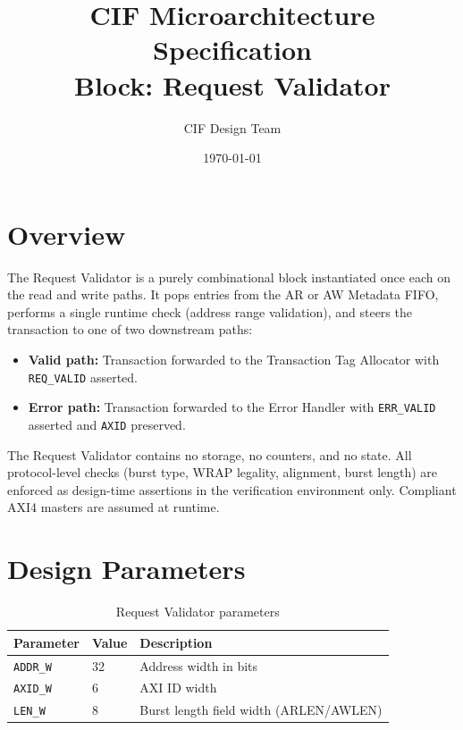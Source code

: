 \documentclass[11pt,a4paper]{article}
\title{\textbf{CIF Microarchitecture Specification}\\[0.4em]
\large Block: Request Validator}
\author{CIF Design Team}
\date{\today}
\begin{document}
\maketitle
\thispagestyle{fancy}
\tableofcontents
\newpage

\section{Overview}

The Request Validator is a purely combinational block instantiated once
each on the read and write paths. It pops entries from the AR or AW
Metadata FIFO, performs a single runtime check (address range
validation), and steers the transaction to one of two downstream paths:

\begin{itemize}
  \item \textbf{Valid path:} Transaction forwarded to the Transaction
        Tag Allocator with \texttt{REQ\_VALID} asserted.
  \item \textbf{Error path:} Transaction forwarded to the Error Handler
        with \texttt{ERR\_VALID} asserted and \texttt{AXID} preserved.
\end{itemize}

The Request Validator contains no storage, no counters, and no state.
All protocol-level checks (burst type, WRAP legality, alignment, burst
length) are enforced as design-time assertions in the verification
environment only. Compliant AXI4 masters are assumed at runtime.

\section{Design Parameters}

\begin{table}[h!]
\centering
\begin{tabular}{lll}
\toprule
\textbf{Parameter} & \textbf{Value} & \textbf{Description} \\
\midrule
\texttt{ADDR\_W}  & 32 & Address width in bits \\
\texttt{AXID\_W}  & 6  & AXI ID width \\
\texttt{LEN\_W}   & 8  & Burst length field width (ARLEN/AWLEN) \\
\bottomrule
\end{tabular}
\caption{Request Validator parameters}
\end{table}
\end{document}
